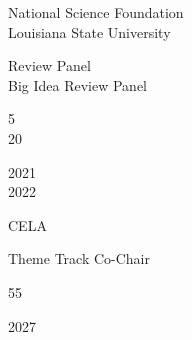 \documentclass[10pt]{designcv}
\begin{document}
\printbibliography[title={\cvsect{Awards}\vspace*{-2em}}, keyword=awards, heading=subbibliography]



\begin{minipage}[t]{0.35\textwidth}
National Science Foundation\\
Louisiana State University\\
\end{minipage}
\hfill
\begin{minipage}[t]{0.3\textwidth}
Review Panel\\
Big Idea Review Panel\\
\end{minipage}
\hfill
\begin{minipage}[t]{0.1\textwidth}
5\\
20\\
\end{minipage}
\hfill
\begin{minipage}[t]{0.15\textwidth}
2021\\
2022\\
\end{minipage}



\begin{minipage}[t]{0.35\textwidth}
CELA\\
\end{minipage}
\hfill
\begin{minipage}[t]{0.3\textwidth}
Theme Track Co-Chair\\
\end{minipage}
\hfill
\begin{minipage}[t]{0.1\textwidth}
55\\
\end{minipage}
\hfill
\begin{minipage}[t]{0.15\textwidth}
2027\\
\end{minipage}
\end{document}
